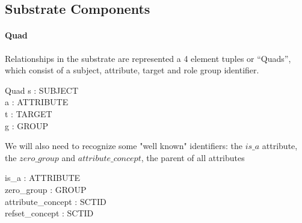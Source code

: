 \documentclass{article}
\begin{document}
\subsection{Substrate Components}
\paragraph{Quad}
Relationships in the substrate are represented a 4 element tuples or ``Quads'', which consist of a subject, attribute, target and role group identifier.

\begin{schema}{Quad}
   s : SUBJECT \\
   a : ATTRIBUTE \\
   t : TARGET \\
   g : GROUP
\end{schema}


We will also need to recognize some "well known" identifiers: the $is\_a$ attribute, the $zero\_group$ and  $attribute\_concept$, the parent of all attributes
\begin{axdef}
is\_a : ATTRIBUTE \\
zero\_group : GROUP \\
attribute\_concept : SCTID \\
refset\_concept : SCTID
\end{axdef}
\end{document}
